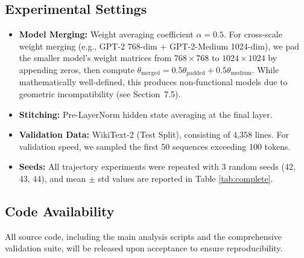 \documentclass[10pt]{article} %
\theoremstyle{plain}
\theoremstyle{definition}
\theoremstyle{remark}
\begin{document}
\subsection{Experimental Settings}
\begin{itemize}
    \item \textbf{Model Merging:} Weight averaging coefficient $\alpha = 0.5$. For cross-scale weight merging (e.g., GPT-2 768-dim + GPT-2-Medium 1024-dim), we pad the smaller model's weight matrices from $768 \times 768$ to $1024 \times 1024$ by appending zeros, then compute $\theta_{\text{merged}} = 0.5\theta_{\text{padded}} + 0.5\theta_{\text{medium}}$. While mathematically well-defined, this produces non-functional models due to geometric incompatibility (see Section~7.5).
    \item \textbf{Stitching:} Pre-LayerNorm hidden state averaging at the final layer.
    \item \textbf{Validation Data:} WikiText-2 (Test Split), consisting of 4,358 lines. For validation speed, we sampled the first 50 sequences exceeding 100 tokens.
    \item \textbf{Seeds:} All trajectory experiments were repeated with 3 random seeds (42, 43, 44), and mean $\pm$ std values are reported in Table \ref{tab:complete}.
\end{itemize}

\subsection{Code Availability}
All source code, including the main analysis scripts and the comprehensive validation suite, will be released upon acceptance to ensure reproducibility.
\end{document}
